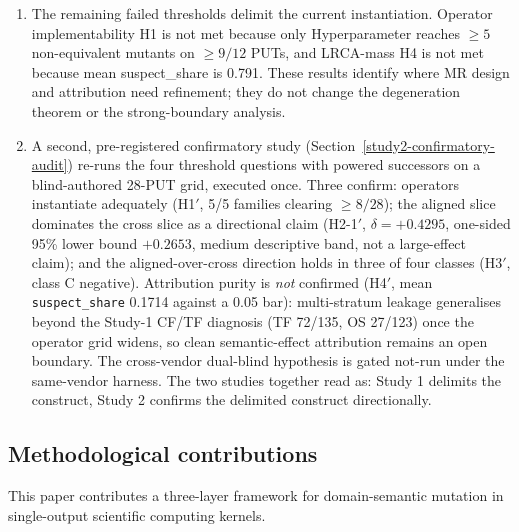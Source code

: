 \documentclass[manuscript,screen,review]{acmart}
\begin{document}
\begin{enumerate}
  shows only a modest aggregate kill-rate advantage
  over literature-generic baselines, and non-nesting
  cases remain in both directions. Thus kill-rate, semantic-stratum
  alignment, and
  real-defect detection should be interpreted as related but distinct
  constructs, on industrial code and not only on the controlled kernels.
\item
  The remaining failed thresholds delimit the current instantiation.
  Operator implementability H1 is not met because only Hyperparameter
  reaches \(\geq 5\) non-equivalent mutants on \(\geq 9/12\) PUTs, and
  LRCA-mass H4 is not met because mean suspect\_share is 0.791. These
  results identify where MR design and attribution need refinement; they
  do not change the degeneration theorem or the strong-boundary
  analysis.
\item
  A second, pre-registered confirmatory study
  (Section~\ref{study2-confirmatory-audit}) re-runs the four threshold
  questions with powered successors on a blind-authored 28-PUT grid,
  executed once. Three confirm: operators instantiate adequately (H1\('\),
  5/5 families clearing \(\geq 8/28\)); the aligned slice dominates the
  cross slice as a directional claim (H2-1\('\), \(\delta = +0.4295\),
  one-sided 95\% lower bound \(+0.2653\), medium descriptive band, not a
  large-effect claim); and the aligned-over-cross direction holds in three
  of four classes (H3\('\), class C negative). Attribution purity is
  \emph{not} confirmed (H4\('\), mean \texttt{suspect\_share} 0.1714
  against a 0.05 bar): multi-stratum leakage generalises beyond the
  Study-1 CF/TF diagnosis (TF 72/135, OS 27/123) once the operator grid
  widens, so clean semantic-effect attribution remains an open boundary.
  The cross-vendor dual-blind hypothesis is gated not-run under the
  same-vendor harness. The two studies together read as: Study 1 delimits
  the construct, Study 2 confirms the delimited construct directionally.
\end{enumerate}

\subsection{Methodological contributions}\label{methodological-contributions}

This paper contributes a three-layer framework for domain-semantic
mutation in single-output scientific computing kernels.
\end{document}
